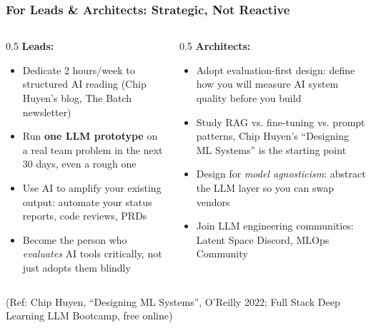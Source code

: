 \begin{frame}[fragile]\frametitle{For Leads \& Architects: Strategic, Not Reactive}

\begin{columns}
    \begin{column}[T]{0.5\linewidth}
\textbf{Leads:}
\begin{itemize}
\item Dedicate 2 hours/week to structured AI reading (Chip Huyen's blog, The Batch newsletter)
\item Run \textbf{one LLM prototype} on a real team problem in the next 30 days, even a rough one
\item Use AI to amplify your existing output: automate your status reports, code reviews, PRDs
\item Become the person who \textit{evaluates} AI tools critically, not just adopts them blindly
\end{itemize}
    \end{column}
    \begin{column}[T]{0.5\linewidth}
\textbf{Architects:}
\begin{itemize}
\item Adopt evaluation-first design: define how you will measure AI system quality before you build
\item Study RAG vs. fine-tuning vs. prompt patterns, Chip Huyen's ``Designing ML Systems'' is the starting point
\item Design for \textit{model agnosticism}: abstract the LLM layer so you can swap vendors
\item Join LLM engineering communities: Latent Space Discord, MLOps Community
\end{itemize}
    \end{column}
\end{columns}

\vspace{0.1cm}
{\tiny (Ref: Chip Huyen, ``Designing ML Systems'', O'Reilly 2022; Full Stack Deep Learning LLM Bootcamp, free online)}

\end{frame}


